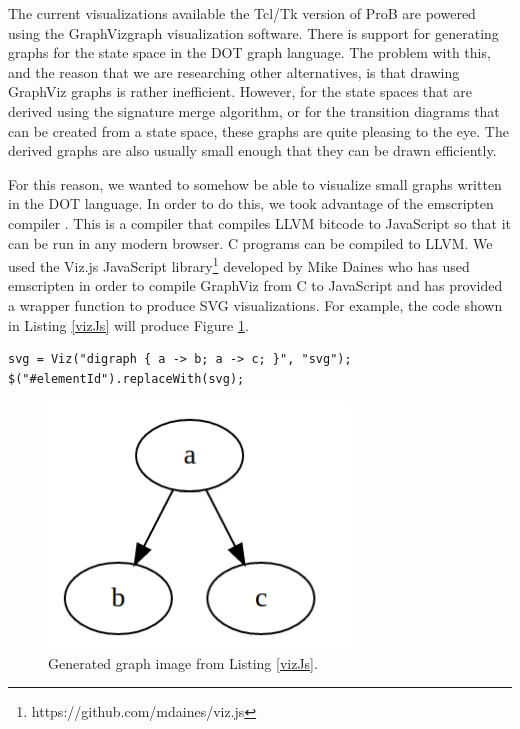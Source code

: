 The current visualizations available the Tcl/Tk version of ProB are powered using the GraphViz\footnotemark[1] graph visualization software. There is support for generating graphs for the state space in the DOT graph language. The problem with this, and the reason that we are researching other alternatives, is that drawing GraphViz graphs is rather inefficient. However, for the state spaces that are derived using the signature merge algorithm, or for the transition diagrams that can be created from a state space, these graphs are quite pleasing to the eye. The derived graphs are also usually small enough that they can be drawn efficiently.

For this reason, we wanted to somehow be able to visualize small graphs written in the DOT language. In order to do this, we took advantage of the emscripten compiler \cite{emscripten}. This is a compiler that compiles LLVM bitcode to JavaScript so that it can be run in any modern browser. C programs can be compiled to LLVM. We used the Viz.js JavaScript library\footnote{https://github.com/mdaines/viz.js} developed by Mike Daines who has used emscripten in order to compile GraphViz from C to JavaScript and has provided a wrapper function to produce SVG visualizations. For example, the code shown in Listing \ref{vizJs} will produce Figure \ref{graphVizEx}.

\begin{lstlisting}[caption=Create a visualization with viz.js and insert it into an html page.,label=vizJs]
svg = Viz("digraph { a -> b; a -> c; }", "svg");
$("#elementId").replaceWith(svg);
\end{lstlisting}

\begin{center}
\begin{figure}[h!]
\centering
\includegraphics[width=8cm]{bilder/graphVizExample.png}
\caption{Generated graph image from Listing \ref{vizJs}.}
\label{graphVizEx}
\end{figure}
\end{center}

\pagebreak